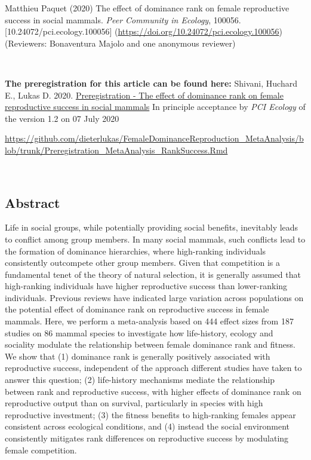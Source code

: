 \documentclass[
]{article}
\begin{document}
Matthieu Paquet (2020) The effect of dominance rank on female
reproductive success in social mammals. \emph{Peer Community in
Ecology}, 100056. {[}10.24072/pci.ecology.100056{]}
(\url{https://doi.org/10.24072/pci.ecology.100056}) (Reviewers:
Bonaventura Majolo and one anonymous reviewer)

~

\textbf{The preregistration for this article can be found here:}
Shivani, Huchard E., Lukas D. 2020.
\href{https://dieterlukas.github.io/Preregistration_MetaAnalysis_RankSuccess.html}{Preregistration
- The effect of dominance rank on female reproductive success in social
mammals} In principle acceptance by \emph{PCI Ecology} of the version
1.2 on 07 July 2020

\url{https://github.com/dieterlukas/FemaleDominanceReproduction_MetaAnalysis/blob/trunk/Preregistration_MetaAnalysis_RankSuccess.Rmd}

~

\hypertarget{abstract}{%
\subsection{Abstract}\label{abstract}}

Life in social groups, while potentially providing social benefits,
inevitably leads to conflict among group members. In many social
mammals, such conflicts lead to the formation of dominance hierarchies,
where high-ranking individuals consistently outcompete other group
members. Given that competition is a fundamental tenet of the theory of
natural selection, it is generally assumed that high-ranking individuals
have higher reproductive success than lower-ranking individuals.
Previous reviews have indicated large variation across populations on
the potential effect of dominance rank on reproductive success in female
mammals. Here, we perform a meta-analysis based on 444 effect sizes from
187 studies on 86 mammal species to investigate how life-history,
ecology and sociality modulate the relationship between female dominance
rank and fitness. We show that (1) dominance rank is generally
positively associated with reproductive success, independent of the
approach different studies have taken to answer this question; (2)
life-history mechanisms mediate the relationship between rank and
reproductive success, with higher effects of dominance rank on
reproductive output than on survival, particularly in species with high
reproductive investment; (3) the fitness benefits to high-ranking
females appear consistent across ecological conditions, and (4) instead
the social environment consistently mitigates rank differences on
reproductive success by modulating female competition.
\end{document}
